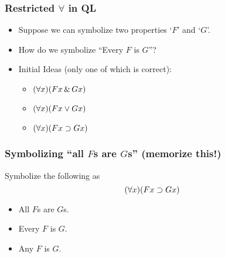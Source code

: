 \begin{frame}
\frametitle{Restricted $\forall$ in QL}

  \begin{itemize}[<+->]
    \item Suppose we can symbolize two properties `$F$' and `$G$'.
    \item How do we symbolize ``Every $F$ is $G$''?
    \item Initial Ideas (only one of which is correct):
      \begin{itemize}[<+->]
        \item \alert{$(\forall x)(Fx \,\&\, Gx)$}
        \\
        \item \alert{$(\forall x)(Fx \vee Gx)$}
        \\ 
        \item \alert{$(\forall x)(Fx \supset Gx)$}
        \\ 
      \end{itemize}
  \end{itemize}
\end{frame}

\begin{frame}
\frametitle{Symbolizing ``all $F$s are $G$s'' (memorize this!)}

Symbolize the following as \emph{\[(\forall x)(Fx \supset Gx)\]}

\begin{itemize}
  \item All $F$s are $G$s.
  \item Every $F$ is $G$.
  \item Any $F$ is $G$.
\end{itemize}
\end{frame}

